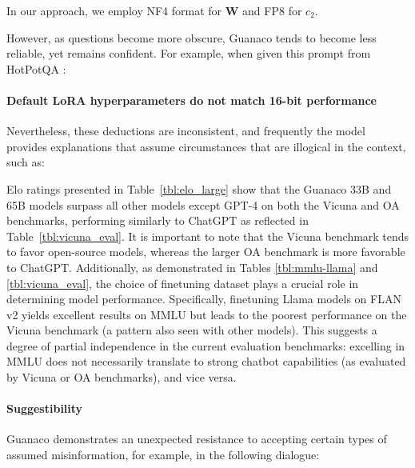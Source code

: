 In our approach, we employ NF4 format for $\mathbf{W}$ and FP8 for $c_2$.

However, as questions become more obscure, {Guanaco} tends to become less reliable, yet remains confident. For example, when given this prompt from HotPotQA \citep{yang2018hotpotqa}:

\paragraph{Default LoRA hyperparameters do not match 16-bit performance}

Nevertheless, these deductions are inconsistent, and frequently the model provides explanations that assume circumstances that are illogical in the context, such as:

Elo ratings presented in Table~\ref{tbl:elo_large} show that the {Guanaco} 33B and 65B models surpass all other models except GPT-4 on both the Vicuna and OA benchmarks, performing similarly to ChatGPT as reflected in Table~\ref{tbl:vicuna_eval}. It is important to note that the Vicuna benchmark tends to favor open-source models, whereas the larger OA benchmark is more favorable to ChatGPT. Additionally, as demonstrated in Tables \ref{tbl:mmlu-llama} and \ref{tbl:vicuna_eval}, the choice of finetuning dataset plays a crucial role in determining model performance. Specifically, finetuning Llama models on FLAN v2 yields excellent results on MMLU but leads to the poorest performance on the Vicuna benchmark (a pattern also seen with other models). This suggests a degree of partial independence in the current evaluation benchmarks: excelling in MMLU does not necessarily translate to strong chatbot capabilities (as evaluated by Vicuna or OA benchmarks), and vice versa.

\paragraph{Suggestibility} {Guanaco} demonstrates an unexpected resistance to accepting certain types of assumed misinformation, for example, in the following dialogue:

